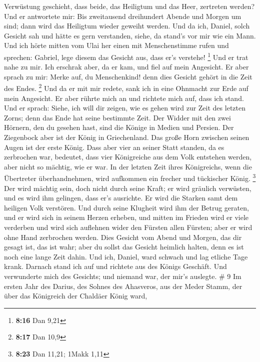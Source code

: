 Verwüstung geschieht, dass beide, das Heiligtum und das Heer, zertreten
werden?  Und er antwortete mir: Bis zweitausend
dreihundert Abende und Morgen um sind; dann wird das Heiligtum wieder
geweiht werden.  Und da ich, Daniel, solch Gesicht sah
und hätte es gern verstanden, siehe, da stand's vor mir wie ein Mann.
 Und ich hörte mitten vom Ulai her einen mit
Menschenstimme rufen und sprechen: Gabriel, lege diesem das Gesicht aus,
dass er's verstehe! \footnote{\textbf{8:16} Dan 9,21} 
Und er trat nahe zu mir. Ich erschrak aber, da er kam, und fiel auf mein
Angesicht. Er aber sprach zu mir: Merke auf, du Menschenkind! denn dies
Gesicht gehört in die Zeit des Endes. \footnote{\textbf{8:17} Dan 10,9}
 Und da er mit mir redete, sank ich in eine Ohnmacht zur
Erde auf mein Angesicht. Er aber rührte mich an und richtete mich auf,
dass ich stand.  Und er sprach: Siehe, ich will dir
zeigen, wie es gehen wird zur Zeit des letzten Zorns; denn das Ende hat
seine bestimmte Zeit.  Der Widder mit den zwei Hörnern,
den du gesehen hast, sind die Könige in Medien und Persien.
 Der Ziegenbock aber ist der König in Griechenland. Das
große Horn zwischen seinen Augen ist der erste König. 
Dass aber vier an seiner Statt standen, da es zerbrochen war, bedeutet,
dass vier Königreiche aus dem Volk entstehen werden, aber nicht so
mächtig, wie er war.  In der letzten Zeit ihres
Königreichs, wenn die Übertreter überhandnehmen, wird aufkommen ein
frecher und tückischer König. \footnote{\textbf{8:23} Dan 11,21; 1Makk
  1,11}  Der wird mächtig sein, doch nicht durch seine
Kraft; er wird gräulich verwüsten, und es wird ihm gelingen, dass er's
ausrichte. Er wird die Starken samt dem heiligen Volk verstören.
 Und durch seine Klugheit wird ihm der Betrug geraten,
und er wird sich in seinem Herzen erheben, und mitten im Frieden wird er
viele verderben und wird sich auflehnen wider den Fürsten allen Fürsten;
aber er wird ohne Hand zerbrochen werden.  Dies Gesicht
vom Abend und Morgen, das dir gesagt ist, das ist wahr; aber du sollst
das Gesicht heimlich halten, denn es ist noch eine lange Zeit dahin.
 Und ich, Daniel, ward schwach und lag etliche Tage
krank. Darnach stand ich auf und richtete aus des Königs Geschäft. Und
verwunderte mich des Gesichts; und niemand war, der mir's auslegte. \# 9
 Im ersten Jahr des Darius, des Sohnes des Ahasveros, aus
der Meder Stamm, der über das Königreich der Chaldäer König ward,
